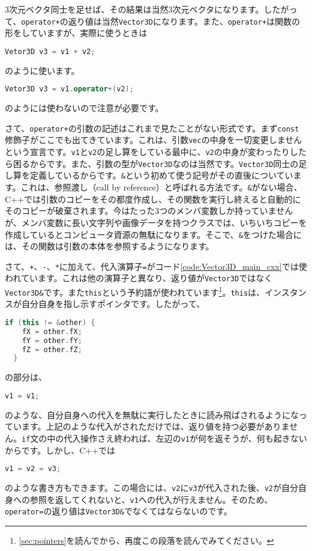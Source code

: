 3次元ベクタ同士を足せば、その結果は当然3次元ベクタになります。したがって、\texttt{operator+}の返り値は当然\texttt{Vector3D}になります。また、\texttt{operator+}は関数の形をしていますが、実際に使うときは
\begin{lstlisting}[language=c++]
Vetor3D v3 = v1 + v2;
\end{lstlisting}
のように使います。
\begin{lstlisting}[language=c++]
Vetor3D v3 = v1.operator+(v2);
\end{lstlisting}
のようには使わないので注意が必要です。

さて、\texttt{operator+}の引数の記述はこれまで見たことがない形式です。まず\texttt{const}修飾子がここでも出てきています。これは、引数\texttt{vec}の中身を一切変更しませんという宣言です。\texttt{v1}と\texttt{v2}の足し算をしている最中に、\texttt{v2}の中身が変わったりしたら困るからです。また、引数の型が\texttt{Vector3D}なのは当然です。\texttt{Vector3D}同士の足し算を定義しているからです。\texttt{\&}という初めて使う記号がその直後についています。これは、参照渡し（call by reference）と呼ばれる方法です。\texttt{\&}がない場合、C++では引数のコピーをその都度作成し、その関数を実行し終えると自動的にそのコピーが破棄されます。今はたった3つのメンバ変数しか持っていませんが、メンバ変数に長い文字列や画像データを持つクラスでは、いちいちコピーを作成しているとコンピュータ資源の無駄になります。そこで、\texttt{\&}をつけた場合には、その関数は引数の本体を参照するようになります。

さて、\texttt{+}、\texttt{-}、\texttt{*}に加えて、代入演算子\texttt{=}がコード\ref{code:Vector3D_main_cxx}では使われています。これは他の演算子と異なり、返り値が\texttt{Vector3D}ではなく\texttt{Vector3D\&}です。また\texttt{this}という予約語が使われています\footnote{\ref{sec:pointers}を読んでから、再度この段落を読んでみてください。}。\texttt{this}は、インスタンスが自分自身を指し示すポインタです。したがって、
\begin{lstlisting}[language=c++]
  if (this != &other) { 
    fX = other.fX; 
    fY = other.fY; 
    fZ = other.fZ; 
  } 
\end{lstlisting}
の部分は、
\begin{lstlisting}[language=c++]
v1 = v1;
\end{lstlisting}
のような、自分自身への代入を無駄に実行したときに読み飛ばされるようになっています。上記のような代入がされただけでは、返り値を持つ必要がありません。\texttt{if}文の中の代入操作さえ終われば、左辺の\texttt{v1}が何を返そうが、何も起きないからです。しかし、C++では
\begin{lstlisting}[language=c++]
v1 = v2 = v3;
\end{lstlisting}
のような書き方もできます。この場合には、\texttt{v2}に\texttt{v3}が代入された後、\texttt{v2}が自分自身への参照を返してくれないと、\texttt{v1}への代入が行えません。そのため、\texttt{operator=}の返り値は\texttt{Vector3D\&}でなくてはならないのです。

